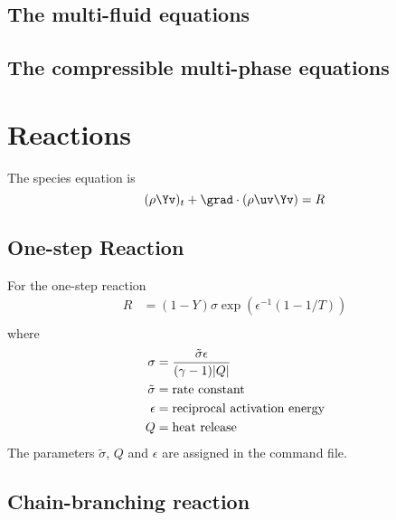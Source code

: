 \documentclass{article}
\begin{document}
\subsection{The multi-fluid equations} \label{sec:multifluid}


\subsection{The compressible multi-phase equations} \label{sec:multiphase}




\section{Reactions}
\newcommand{\sigmat}{\tilde{\sigma}}

The species equation is
\[
   (\rho \Yv )_t + \grad\cdot( \rho \uv \Yv ) = R
\]

\subsection{One-step Reaction} \label{sec:oneStepReaction}

For the one-step reaction
\begin{align*}
   R &= (1-Y)\sigma \exp(\epsilon^{-1}(1-1/T)) \\
\end{align*}
where
\begin{align*}
  \sigma &= { \sigmat \epsilon \over (\gamma -1) | Q | } \\
  \sigmat &= \mbox{rate constant} \\
  \epsilon &= \mbox{reciprocal activation energy} \\
   Q &= \mbox{heat release}
\end{align*}
The parameters $\sigmat$, $Q$ and $\epsilon$ are assigned in the command file.

\def\bs{{\mathbf Y}} %
\subsection{Chain-branching reaction} \label{sec:chainBranchingReaction}
\end{document}
